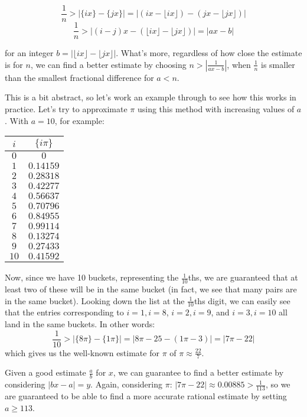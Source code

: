 \documentclass{article}
\begin{document}
\[ \frac{1}{n} > |\{ix\}-\{jx\}| = | (ix-\lfloor ix \rfloor) - (jx - \lfloor jx \rfloor) | \]
\[ \frac{1}{n} > | (i-j)x - (\lfloor ix \rfloor - \lfloor jx \rfloor ) | = | ax-b | \]

for an integer $b = |\lfloor ix \rfloor - \lfloor jx \rfloor|$. What's more, regardless of how close
the estimate is for $n$, we can find a better estimate by choosing $n > |\frac{1}{ax-b}|$, when
$\frac{1}{n}$ is smaller than the smallest fractional difference for $a<n$.

This is a bit abstract, so let's work an example through to see how this works in practice. Let's try
to approximate $\pi$ using this method with increasing values of $a$. With $a=10$, for example:

\begin{center}
	\begin{tabular}{|c|c|}
		\hline
		$i$ & $\{i\pi\}$ \\
		\hline
		$0$ & $0$ \\
		$1$ & $0.14159$ \\
		$2$ & $0.28318$ \\
		$3$ & $0.42277$ \\
		$4$ & $0.56637$ \\
		$5$ & $0.70796$ \\
		$6$ & $0.84955$ \\
		$7$ & $0.99114$ \\
		$8$ & $0.13274$ \\
		$9$ & $0.27433$ \\
		$10$ & $0.41592$ \\
		\hline
	\end{tabular}
\end{center}

Now, since we have 10 buckets, representing the $\frac{1}{10}$ths, we are guaranteed that at
least two of these will be in the same bucket (in fact, we see that many pairs are in the same
bucket). Looking down the list at the $\frac{1}{10}$ths digit, we can easily see that the
entries corresponding to $i=1, i=8$, $i=2, i=9$, and $i=3, i=10$ all land in the same buckets.
In other words:
\[ \frac{1}{10}> |\{8\pi\}-\{1\pi\}| = | 8\pi - 25 - (1\pi - 3)| = |7\pi -22| \]
which gives us the well-known estimate for $\pi$ of $\pi \approx \frac{22}{7}$. 

Given a good estimate $\frac{a}{b}$ for $x$, we can guarantee to find a better estimate by 
considering $|bx-a| = y$. Again, considering $\pi$: $|7\pi - 22| \approx 0.00885 > 
\frac{1}{113}$, so we are guaranteed to be able to find a more accurate rational estimate by setting
$a \geq 113$.
\end{document}
